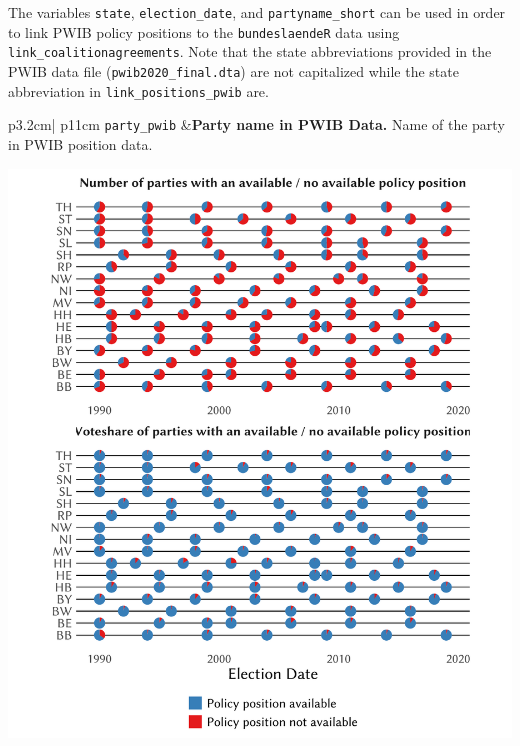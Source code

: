 \documentclass[
]{scrartcl}
\begin{document}
The variables \texttt{state}, \texttt{election\_date}, and
\texttt{partyname\_short} can be used in order to link PWIB policy
positions to the \texttt{bundeslaendeR} data using
\texttt{link\_coalitionagreements}. Note that the state abbreviations
provided in the PWIB data file (\texttt{pwib2020\_final.dta}) are not
capitalized while the state abbreviation in
\texttt{link\_positions\_pwib} are.

\begin{longtable}{p{3.2cm}| p{11cm}}
\texttt{party\_pwib} &\textbf{Party name in PWIB Data.}\newline 
Name of the party in PWIB position data.








\hspace*{.25cm}
\begin{minipage}[t]{\linewidth }
\vspace{0pt}
\includegraphics[width = \linewidth]{cbfiles/pwibplot.pdf}
\end{minipage}







\end{longtable}
\end{document}
